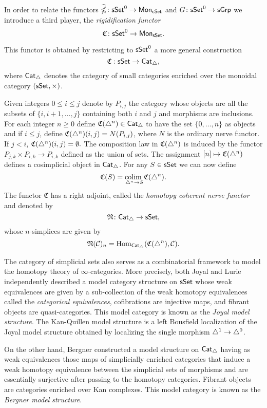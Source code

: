 In order to relate the functors $\widehat{\operatorname{\mathbb{\Omega}}} \colon \mathsf{sSet}^0 \to \mathsf{Mon}_{\mathsf{cSet}}$ and $G \colon \mathsf{sSet}^0\to \mathsf{sGrp}$ we introduce a third player, the \textit{rigidification functor} $$\mathfrak{C} \colon \mathsf{sSet}^0 \to \mathsf{Mon}_{\mathsf{sSet}}.$$

This functor is obtained by restricting to $\mathsf{sSet}^0$ a more general construction
$$\mathfrak{C}: \mathsf{sSet} \to \mathsf{Cat}_{\triangle},$$
where $\mathsf{Cat}_{\triangle}$ denotes the category of small categories enriched over the monoidal category $(\mathsf{sSet}, \times)$. 

Given integers $0 \leq  i \leq j$ denote by $P_{i,j}$ the category whose objects are all the subsets of $\{i, i+1, \dots, j\}$ containing both $i$ and $j$ and morphisms are inclusions.
For each integer $n \geq 0$ define $\mathfrak{C}(\triangle^n) \in \mathsf{Cat}_{\triangle}$ to have the set $\{0, \dots, n\}$ as objects and if $i \leq j$, define $\mathfrak{C}(\triangle^n)(i,j)= N(P_{i,j})$, where $N$ is the ordinary nerve functor.
If $j < i$, $\mathfrak{C}(\triangle^n)(i,j) = \emptyset.$ The composition law in $\mathfrak{C}(\triangle^n)$ is induced by the functor $P_{j,k} \times P_{i,k} \to P_{i,k}$ defined as the union of sets.
The assignment $[n] \mapsto \mathfrak{C}(\triangle^n)$ defines a cosimplicial object in $\mathsf{Cat}_{\triangle}$.
For any $S \in \mathsf{sSet}$ we can now define
 $$\mathfrak{C}(S) = \underset{{\triangle^n \to S} }{\text{colim }} \mathfrak{C}(\triangle^n).$$
The functor $\mathfrak{C}$ has a right adjoint, called the \textit{homotopy coherent nerve functor} and denoted by
$$\mathfrak{N} \colon \mathsf{Cat}_{\triangle} \to \mathsf{sSet},$$ whose $n$-simplices are given by 
$$\mathfrak{N}(\mathcal{C})_n=\text{Hom}_{\mathsf{Cat}_{\triangle}}(\mathfrak{C}(\triangle^n), \mathcal{C}).$$

The category of simplicial sets also serves as a combinatorial framework to model the homotopy theory of $\infty$-categories. More precisely, both Joyal and Lurie independently described a model category structure on $\mathsf{sSet}$ whose weak equivalences are given by a sub-collection of the weak homotopy equivalences called the \textit{categorical equivalences}, cofibrations are injective maps, and fibrant objects are quasi-categories. This model category is known as the \textit{Joyal model structure}. The Kan-Quillen model structure is a left Bousfield localization of the Joyal model structure obtained by localizing the single morphism $\triangle^1 \to \triangle^0$.

On the other hand, Bergner constructed a model structure on $\mathsf{Cat}_{\triangle}$ having as weak equivalences those maps of simplicially enriched categories that induce a weak homotopy equivalence between the simplicial sets of morphisms and are essentially surjective after passing to the homotopy categories. Fibrant objects are categories enriched over Kan complexes. This model category is known as the \textit{Bergner model structure}. 

